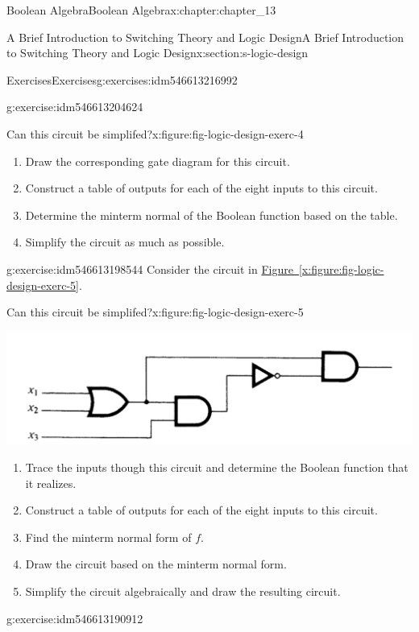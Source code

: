 \documentclass[oneside,10pt,]{book}
\newcommand{\xreffont}{\relax}
\numberwithin{equation}{section}
\begin{document}
\begin{chapterptx}{Boolean Algebra}{}{Boolean Algebra}{}{}{x:chapter:chapter_13}
\begin{sectionptx}{A Brief Introduction to Switching Theory and Logic Design}{}{A Brief Introduction to Switching Theory and Logic Design}{}{}{x:section:s-logic-design}
\begin{exercises-subsection}{Exercises}{}{Exercises}{}{}{g:exercises:idm546613216992}
\begin{divisionexercise}{4}{}{}{g:exercise:idm546613204624}
\begin{figureptx}{Can this circuit be simplifed?}{x:figure:fig-logic-design-exerc-4}{}
\begin{image}{0}{1}{0}
\end{image}%
\tcblower
\end{figureptx}%
%
\begin{enumerate}[label=(\alph*)]
\item{}Draw the corresponding gate diagram for this circuit.%
\item{}Construct a table of outputs for each of the eight inputs to this circuit.%
\item{}Determine the minterm normal of the Boolean function based on the table.%
\item{}Simplify the circuit as much as possible.%
\end{enumerate}
%
\end{divisionexercise}%
\begin{divisionexercise}{5}{}{}{g:exercise:idm546613198544}%
Consider the circuit in \hyperref[x:figure:fig-logic-design-exerc-5]{Figure~{\xreffont\ref{x:figure:fig-logic-design-exerc-5}}}.%
\begin{figureptx}{Can this circuit be simplifed?}{x:figure:fig-logic-design-exerc-5}{}%
\begin{image}{0}{1}{0}%
\includegraphics[width=\linewidth]{images/fig-logic-design-exerc-5.png}
\end{image}%
\tcblower
\end{figureptx}%
%
\begin{enumerate}[label=(\alph*)]
\item{}Trace the inputs though this circuit and determine the Boolean function that it realizes.%
\item{}Construct a table of outputs for each of the eight inputs to this circuit.%
\item{}Find the minterm normal form of \(f\).%
\item{}Draw the circuit based on the minterm normal form.%
\item{}Simplify the circuit algebraically and draw the resulting circuit.%
\end{enumerate}
%
\end{divisionexercise}%
\begin{divisionexercise}{6}{}{}{g:exercise:idm546613190912}%

\end{divisionexercise}
\end{exercises-subsection}
\end{sectionptx}
\end{chapterptx}
\end{document}
